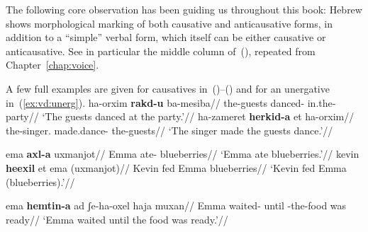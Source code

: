 The following core observation has been guiding us throughout this book: Hebrew shows morphological marking of both causative and anticausative forms, in addition to a ``simple'' verbal form, which itself can be either causative or anticausative. See in particular the middle column of~(\nextx), repeated from Chapter~\ref{chap:voice}.
\ex \label{vd:ex:alternations-heb}
\xe

A few full examples are given for causatives in~(\nextx)--(\anextx) and for an unergative in~(\ref{ex:vd:unerg}).
\pex
	\a \begingl
		\gla ha-orxim \textbf{rakd-u} ba-mesiba//
		\glb the-guests danced- in.the-party//
		\glft `The guests danced at the party.'//
	\endgl
	\a \begingl
		\gla ha-zameret \textbf{herkid-a} et ha-orxim//
		\glb the-singer. made.dance-  the-guests//
		\glft `The singer made the guests dance.'//
	\endgl
\xe

\pex
	\a \begingl
		\gla ema \textbf{axl-a} uxmanjot//
		\glb Emma ate- blueberries//
		\glft `Emma ate blueberries.'//
	\endgl
	\a \begingl
		\gla kevin \textbf{heexil} et ema (uxmanjot)//
		\glb Kevin fed  Emma blueberries//
		\glft `Kevin fed Emma (blueberries).'//
	\endgl %
\xe

\ex \label{ex:vd:unerg} \begingl
	\gla ema \textbf{hemtin-a} ad ʃe-ha-oxel haja muxan//
	\glb Emma waited- until -the-food was ready//
	\glft `Emma waited until the food was ready.'//
	\endgl
\xe

